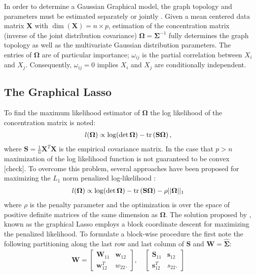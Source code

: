 In order to determine a Gaussian Graphical model, the graph topology and parameters must be estimated separately \cite{meinshausen2006} or jointly \cite{friedman2007,yuan2007,banerjee2008}. Given a mean centered data matrix $\textbf{X}$ with $\dim(\textbf{X})=n\times p$, estimation of the concentration matrix (inverse of the joint distribution covariance) $\boldsymbol{\Omega}=\boldsymbol{\Sigma}^{-1}$ fully determines the graph topology as well as the multivariate Gaussian distribution parameters. The entries of $\boldsymbol{\Omega}$ are of particular importance; $\omega_{ij}$ is the partial correlation between $X_i$ and $X_j$. Consequently, $\omega_{ij}=0$ implies $X_i$ and $X_j$ are conditionally independent.

\subsection{The Graphical Lasso}
To find the maximum likelihood estimator of $\boldsymbol{\Omega}$ the log likelihood of the concentration matrix is noted:
\begin{align} 
l(\boldsymbol{\Omega})\propto\log (\det \boldsymbol{\Omega})-\operatorname{tr} \left( \textbf{S} \boldsymbol{\Omega} \right),
\end{align}
where $\textbf{S}=\frac{1}{n}\textbf{X}^T \textbf{X}$ is the empirical covariance matrix. In the case that $p>n$ maximization of the log likelihood function is not guaranteed to be convex [check]. To overcome this problem, several approaches have been proposed for maximizing the $L_1$ norm penalized log-likelihood \cite{friedman2007,yuan2007,banerjee2008}:
\begin{align}
l(\boldsymbol{\Omega})\propto\log (\det \boldsymbol{\Omega})-\operatorname{tr} \left( \textbf{S} \boldsymbol{\Omega} \right)-\rho ||\boldsymbol{\Omega}||_1
\label{eq:likelihood}
\end{align}
where $\rho$ is the penalty parameter and the optimization is over the space of positive definite matrices of the same dimension as $\boldsymbol{\Omega}$.
The solution proposed by \cite{friedman2007}, known as the graphical Lasso employs a block coordinate descent for maximizing the penalized likelihood. To formulate a block-wise procedure the \cite{friedman2007} first note the following partitioning along the last row and last column of $\textbf{S}$ and $\textbf{W}=\hat{\boldsymbol{\Sigma}}$:
\begin{align}
\textbf{W}=
\begin{bmatrix}
\textbf{W}_{11} & \textbf{w}_{12} \\
\textbf{w}_{12}^T & w_{22}.
\end{bmatrix}, \quad
\begin{bmatrix}
\textbf{S}_{11} & \textbf{s}_{12} \\
\textbf{s}_{12}^T & s_{22}.
\end{bmatrix}
\end{align}  
